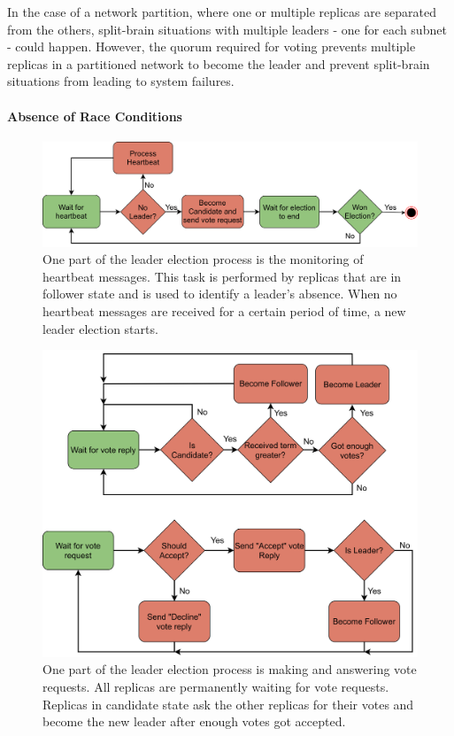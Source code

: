 In the case of a network partition, where one or multiple replicas are separated from the others, split-brain situations with multiple leaders - one for each subnet - could happen.
However, the quorum required for voting prevents multiple replicas in a partitioned network to become the leader and prevent split-brain situations from leading to system failures.

\paragraph{Absence of Race Conditions}

\begin{figure}[!ht]
	\centering
	\includegraphics[width=0.9\linewidth]{images/LeaderElectionHeartbeatThread}
	\caption{One part of the leader election process is the monitoring of heartbeat messages. This task is performed by replicas that are in follower state and is used to identify a leader's absence. When no heartbeat messages are received for a certain period of time, a new leader election starts.}
	\label{fig:LeaderElectionHeartbeatThread}
\end{figure}

\begin{figure}[!hb]
	\centering
	\includegraphics[width=0.9\linewidth]{images/LeaderElectionVoteThread}
	\caption{One part of the leader election process is making and answering vote requests. All replicas are permanently waiting for vote requests. Replicas in candidate state ask the other replicas for their votes and become the new leader after enough votes got accepted.}
	\label{fig:LeaderElectionVoteThread}
\end{figure}


